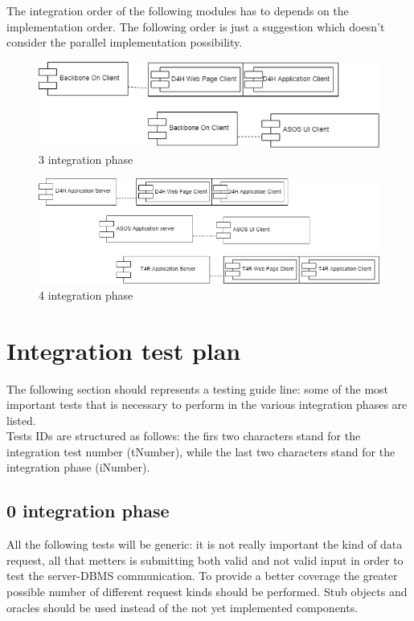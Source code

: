 The integration order of the following modules has to depends on the implementation order. The following order is just a suggestion which doesn't consider the parallel implementation possibility.
\begin{figure}[H]
\caption{3 integration phase}
\includegraphics[width = \textwidth]{sections/implementationIntegrationTestGraphs/IntegrationOrder3phase.png}
\end{figure}
\begin{figure}[H]
\caption{4 integration phase}
\includegraphics[width = \textwidth]{sections/implementationIntegrationTestGraphs/IntegrationOrder4phase.png}
\end{figure}

\section{Integration test plan}
The following section should represents  a testing guide line: some of the most important tests that is necessary to perform in the various integration phases are listed. \\
Tests IDs are structured as follows: the firs two characters stand for the integration test number (tNumber), while the last two characters stand for the  integration phase (iNumber).
\subsection{0 integration phase}

All the following tests will be generic: it is not really important the kind of data request, all that metters is submitting both valid and not valid input in order to test the server-DBMS communication. To provide a better coverage the greater possible number of different request kinds should be performed. Stub objects and oracles should be used instead of the not yet implemented components.

